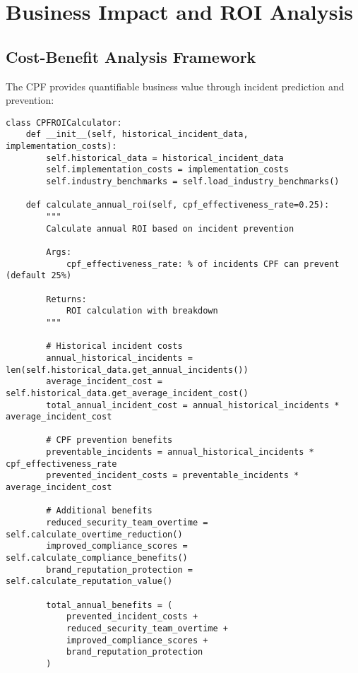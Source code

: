 \documentclass[10pt,twocolumn]{IEEEtran}
\begin{document}
\section{Business Impact and ROI Analysis}

\subsection{Cost-Benefit Analysis Framework}

The CPF provides quantifiable business value through incident prediction and prevention:

\begin{lstlisting}[caption={ROI Calculation Framework}]
class CPFROICalculator:
    def __init__(self, historical_incident_data, implementation_costs):
        self.historical_data = historical_incident_data
        self.implementation_costs = implementation_costs
        self.industry_benchmarks = self.load_industry_benchmarks()
        
    def calculate_annual_roi(self, cpf_effectiveness_rate=0.25):
        """
        Calculate annual ROI based on incident prevention
        
        Args:
            cpf_effectiveness_rate: % of incidents CPF can prevent (default 25%)
        
        Returns:
            ROI calculation with breakdown
        """
        
        # Historical incident costs
        annual_historical_incidents = len(self.historical_data.get_annual_incidents())
        average_incident_cost = self.historical_data.get_average_incident_cost()
        total_annual_incident_cost = annual_historical_incidents * average_incident_cost
        
        # CPF prevention benefits
        preventable_incidents = annual_historical_incidents * cpf_effectiveness_rate
        prevented_incident_costs = preventable_incidents * average_incident_cost
        
        # Additional benefits
        reduced_security_team_overtime = self.calculate_overtime_reduction()
        improved_compliance_scores = self.calculate_compliance_benefits()
        brand_reputation_protection = self.calculate_reputation_value()
        
        total_annual_benefits = (
            prevented_incident_costs +
            reduced_security_team_overtime +
            improved_compliance_scores +
            brand_reputation_protection
        )
        

\end{lstlisting}
\end{document}
